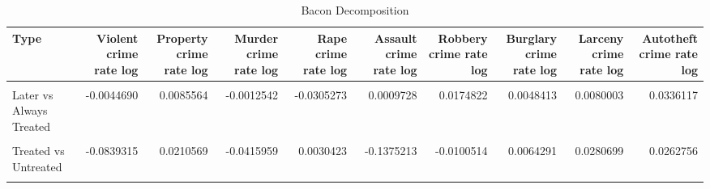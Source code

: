 \begin{table}[H]

\caption{\label{tab:tab:bacondecomposition}Bacon Decomposition}
\centering
\begin{tabular}[t]{lrrrrrrrrr}
\toprule
Type & Violent crime rate log & Property crime rate log & Murder crime rate log & Rape crime rate log & Assault crime rate log & Robbery crime rate log & Burglary crime rate log & Larceny crime rate log & Autotheft crime rate log\\
\midrule
\cellcolor{gray!6}{Earlier vs Later Treated} & \cellcolor{gray!6}{0.0051705} & \cellcolor{gray!6}{-0.0007191} & \cellcolor{gray!6}{0.0054525} & \cellcolor{gray!6}{-0.0026425} & \cellcolor{gray!6}{0.0079628} & \cellcolor{gray!6}{0.0073682} & \cellcolor{gray!6}{-0.0023226} & \cellcolor{gray!6}{-0.0004160} & \cellcolor{gray!6}{0.0056843}\\
Later vs Always Treated & -0.0044690 & 0.0085564 & -0.0012542 & -0.0305273 & 0.0009728 & 0.0174822 & 0.0048413 & 0.0080003 & 0.0336117\\
\cellcolor{gray!6}{Later vs Earlier Treated} & \cellcolor{gray!6}{-0.0017883} & \cellcolor{gray!6}{0.0001507} & \cellcolor{gray!6}{0.0000418} & \cellcolor{gray!6}{-0.0019283} & \cellcolor{gray!6}{-0.0034427} & \cellcolor{gray!6}{0.0020947} & \cellcolor{gray!6}{-0.0013013} & \cellcolor{gray!6}{0.0004859} & \cellcolor{gray!6}{0.0020305}\\
Treated vs Untreated & -0.0839315 & 0.0210569 & -0.0415959 & 0.0030423 & -0.1375213 & -0.0100514 & 0.0064291 & 0.0280699 & 0.0262756\\
\cellcolor{gray!6}{Total TWFE} & \cellcolor{gray!6}{-0.0850183} & \cellcolor{gray!6}{0.0290449} & \cellcolor{gray!6}{-0.0373558} & \cellcolor{gray!6}{-0.0320558} & \cellcolor{gray!6}{-0.1320284} & \cellcolor{gray!6}{0.0168936} & \cellcolor{gray!6}{0.0076465} & \cellcolor{gray!6}{0.0361400} & \cellcolor{gray!6}{0.0676020}\\
\bottomrule
\end{tabular}
\end{table}
